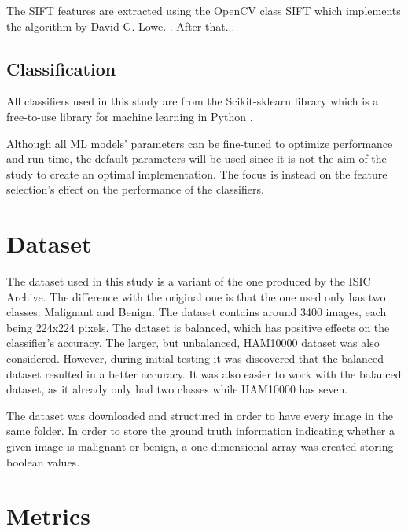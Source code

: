 \documentclass{kththesis}
\begin{document}
The SIFT features are extracted using the OpenCV class SIFT which implements the algorithm by David G. Lowe. \parencite{sift-opencv} \parencite{lowe2004distinctive}.
After that... %


\subsection{Classification}

All classifiers used in this study are from the Scikit-sklearn library which is a free-to-use library for machine learning in Python \parencite{scikit-learn-doc}.

Although all ML models’ parameters can be fine-tuned to optimize performance and run-time, the default parameters will be used since it is not the aim of the study to create an optimal implementation. The focus is instead on the feature selection’s effect on the performance of the classifiers.


\section{Dataset}

The dataset used in this study is a variant of the one produced by the ISIC Archive. The difference with the original one is that the one used only has two classes: Malignant and Benign. The dataset contains around 3400 images, each being 224x224 pixels. The dataset is balanced, which has positive effects on the classifier's accuracy. The larger, but unbalanced, HAM10000 dataset was also considered. However, during initial testing it was discovered that the balanced dataset resulted in a better accuracy. It was also easier to work with the balanced dataset, as it already only had two classes while HAM10000 has seven.

The dataset was downloaded and structured in order to have every image in the same folder. In order to store the ground truth information indicating whether a given image is malignant or benign, a one-dimensional array was created storing boolean values.

\section{Metrics}
\end{document}
